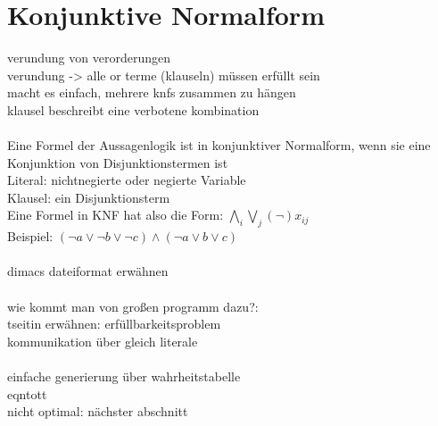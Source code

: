 \section{Konjunktive Normalform}
\label{sec:knf}


verundung von verorderungen\\
verundung -> alle or terme (klauseln) müssen erfüllt sein\\
macht es einfach, mehrere knfs zusammen zu hängen\\
klausel beschreibt eine verbotene kombination\\
~\\
Eine Formel der Aussagenlogik ist in konjunktiver Normalform, wenn sie eine Konjunktion von Disjunktionstermen ist\\
Literal: nichtnegierte oder negierte Variable\\
Klausel: ein Disjunktionsterm\\
Eine Formel in KNF hat also die Form: \newline \newline $ \bigwedge\limits_{i} \bigvee\limits_{j} (\neg)x_{ij} $\\
Beispiel: $ (\neg a \vee \neg b \vee \neg c) \wedge (\neg a \vee b \vee c) $\\
~\\
dimacs dateiformat erwähnen\\
~\\
wie kommt man von großen programm dazu?:\\
tseitin erwähnen: erfüllbarkeitsproblem\\
kommunikation über gleich literale\\
~\\
einfache generierung über wahrheitstabelle\\
eqntott\\
nicht optimal: nächster abschnitt